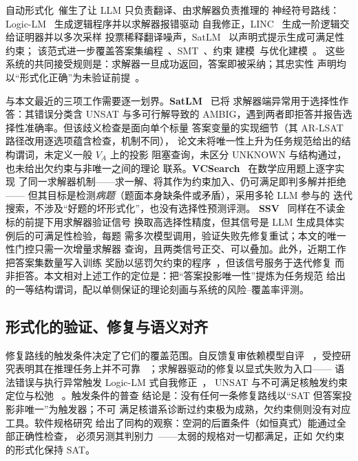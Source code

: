 \documentclass[letterpaper]{article}
\begin{document}
自动形式化~\cite{wu2022}催生了让 LLM 只负责翻译、由求解器负责推理的
神经符号路线：Logic-LM~\cite{pan2023} 生成逻辑程序并以求解器报错驱动
自我修正，LINC~\cite{olausson2023} 生成一阶逻辑交给证明器并以多次采样
投票稀释翻译噪声，SatLM~\cite{ye2023} 以声明式提示生成可满足性约束；
该范式进一步覆盖答案集编程~\cite{ishay2023}、SMT~\cite{oh2026}、约束
建模~\cite{tsouros2023,michailidis2024}与优化建模~\cite{ahmaditeshnizi2024}。
这些系统的共同接受规则是：求解器一旦成功返回，答案即被采纳；其忠实性
声明均以``形式化正确''为未验证前提~\cite{pan2023}。

与本文最近的三项工作需要逐一划界。\textbf{SatLM}~\cite{ye2023} 已将
求解器端异常用于选择性作答：其错误分类含 UNSAT 与多可行解导致的
AMBIG，遇到两者即拒答并报告选择性准确率。但该歧义检查是面向单个标量
答案变量的实现细节（其 AR-LSAT 路径改用逐选项蕴含检查，机制不同），
论文未将唯一性上升为任务规范给出的结构谓词，未定义一般 $V_A$ 上的投影
阻塞查询，未区分 UNKNOWN 与结构通过，也未给出欠约束与非唯一之间的理论
联系。\textbf{VCSearch}~\cite{tian2025vcsearch} 在数学应用题上逐字实现
了同一求解器机制——求一解、将其作为约束加入、仍可满足即判多解并拒绝——
但其目标是检测\emph{病题}（题面本身缺条件或矛盾），采用多轮 LLM 参与的
迭代搜索，不涉及``好题的坏形式化''，也没有选择性预测评测。
\textbf{SSV}~\cite{raza2025} 同样在不读金标的前提下用求解器验证信号
换取高选择性精度，但其信号是 LLM 生成具体实例后的可满足性检验，每题
需多次模型调用，验证失败先修复重试；本文的唯一性门控只需一次增量求解器
查询，且两类信号正交、可以叠加。此外，近期工作把答案集数量写入训练
奖励以惩罚欠约束的程序~\cite{schrader2026}，但该信号服务于迭代修复
而非拒答。本文相对上述工作的定位是：把``答案投影唯一性''提炼为任务规范
给出的一等结构谓词，配以单侧保证的理论刻画与系统的风险--覆盖率评测。

\subsection{形式化的验证、修复与语义对齐}
\label{sec:rw-repair}

修复路线的触发条件决定了它们的覆盖范围。自反馈复审依赖模型自评
~\cite{madaan2023,shinn2023}，受控研究表明其在推理任务上并不可靠
~\cite{huang2024,olausson2024}；求解器驱动的修复以显式失败为入口——
语法错误与执行异常触发 Logic-LM 式自我修正~\cite{pan2023,kirtania2024}，
UNSAT 与不可满足核触发约束定位与松弛
~\cite{liffiton2008,chen2024optichat,singh2026,ao2026}。触发条件的普查
结论是：没有任何一条修复路线以``SAT 但答案投影非唯一''为触发器；不可
满足核谱系诊断过约束极为成熟，欠约束侧则没有对应工具。软件规格研究
给出了同构的观察：空洞的后置条件（如恒真式）能通过全部正确性检查，
必须另测其判别力~\cite{endres2024}——太弱的规格对一切都满足，正如
欠约束的形式化保持 SAT。
\end{document}
